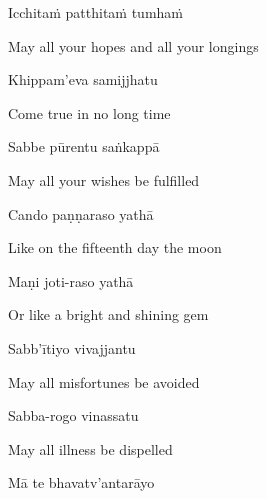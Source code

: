 Icchitaṁ patthitaṁ tumhaṁ

\begin{english}
  May all your hopes and all your longings
\end{english}

Khippam'eva samijjhatu

\begin{english}
  Come true in no long time
\end{english}

Sabbe pūrentu saṅkappā

\begin{english}
  May all your wishes be fulfilled
\end{english}

Cando paṇṇaraso yathā

\begin{english}
  Like on the fifteenth day the moon
\end{english}

\ifninebythirteenversion\clearpage\fi

Maṇi joti-raso yathā\makeatletter\hyperlink{endnote116-appendix}\makeatother

\begin{english}
  Or like a bright and shining gem\\
\end{english}

\suttaRef{[Kp 7]}

Sabb'ītiyo vivajjantu\makeatletter\hyperlink{endnote117-appendix}\makeatother

\begin{english}
  May all misfortunes be avoided
\end{english}

Sabba-rogo vinassatu

\begin{english}
  May all illness be dispelled
\end{english}

Mā te bhavatv'antarāyo

